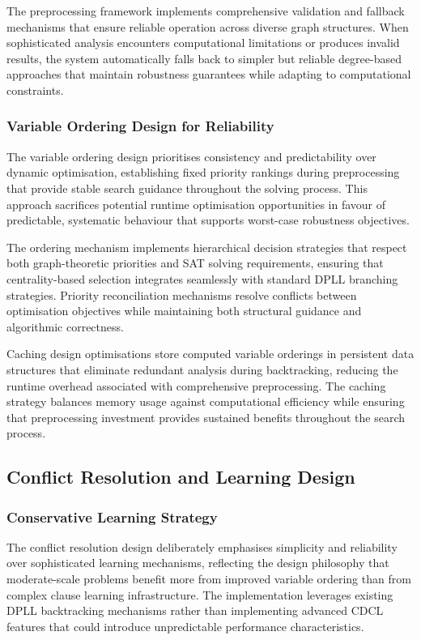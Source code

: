 The preprocessing framework implements comprehensive validation and fallback mechanisms that ensure reliable operation across diverse graph structures. When sophisticated analysis encounters computational limitations or produces invalid results, the system automatically falls back to simpler but reliable degree-based approaches that maintain robustness guarantees while adapting to computational constraints.

\subsubsection{Variable Ordering Design for Reliability}

The variable ordering design prioritises consistency and predictability over dynamic optimisation, establishing fixed priority rankings during preprocessing that provide stable search guidance throughout the solving process. This approach sacrifices potential runtime optimisation opportunities in favour of predictable, systematic behaviour that supports worst-case robustness objectives.

The ordering mechanism implements hierarchical decision strategies that respect both graph-theoretic priorities and SAT solving requirements, ensuring that centrality-based selection integrates seamlessly with standard DPLL branching strategies. Priority reconciliation mechanisms resolve conflicts between optimisation objectives while maintaining both structural guidance and algorithmic correctness.

Caching design optimisations store computed variable orderings in persistent data structures that eliminate redundant analysis during backtracking, reducing the runtime overhead associated with comprehensive preprocessing. The caching strategy balances memory usage against computational efficiency while ensuring that preprocessing investment provides sustained benefits throughout the search process.

\subsection{Conflict Resolution and Learning Design}

\subsubsection{Conservative Learning Strategy}

The conflict resolution design deliberately emphasises simplicity and reliability over sophisticated learning mechanisms, reflecting the design philosophy that moderate-scale problems benefit more from improved variable ordering than from complex clause learning infrastructure. The implementation leverages existing DPLL backtracking mechanisms rather than implementing advanced CDCL features that could introduce unpredictable performance characteristics.

